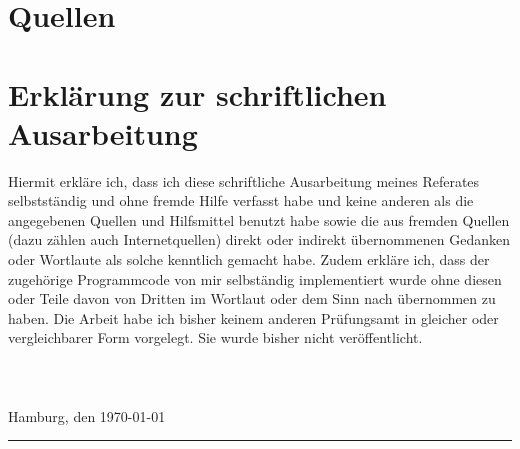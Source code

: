 \documentclass[11pt]{article}
\begin{document}
    \section{Quellen}
    
    
    \newpage

    \section{Erkl\"arung zur schriftlichen Ausarbeitung}

    Hiermit erkl\"are ich, dass ich diese schriftliche Ausarbeitung meines Referates selbstst\"andig und ohne fremde Hilfe verfasst habe und keine anderen als die angegebenen Quellen und Hilfsmittel benutzt habe sowie die aus fremden Quellen (dazu z\"ahlen auch Internetquellen) direkt oder indirekt \"ubernommenen Gedanken oder Wortlaute als solche kenntlich gemacht habe. Zudem erkl\"are ich, dass der zugeh\"orige Programmcode von mir selbst\"andig implementiert wurde ohne diesen oder Teile davon von Dritten im Wortlaut oder dem Sinn nach \"ubernommen zu haben. Die Arbeit habe ich bisher keinem anderen Pr\"ufungsamt in gleicher oder vergleichbarer Form vorgelegt. Sie wurde bisher nicht ver\"offentlicht.\\ \\ \\ \\
    Hamburg, den \today \indent\rule{8.5cm}{0.4pt}
\end{document}
